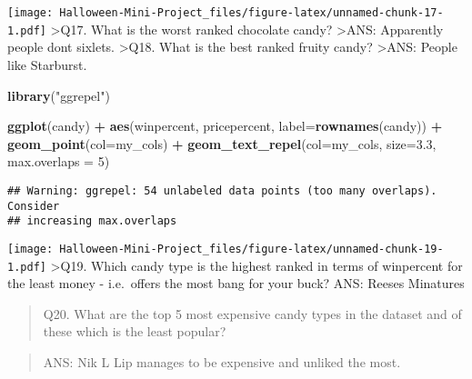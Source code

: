 \documentclass[
]{article}
\newenvironment{Shaded}{\begin{snugshade}}{\end{snugshade}}
\newcommand{\AttributeTok}[1]{\textcolor[rgb]{0.13,0.29,0.53}{#1}}
\newcommand{\ConstantTok}[1]{\textcolor[rgb]{0.56,0.35,0.01}{#1}}
\newcommand{\DecValTok}[1]{\textcolor[rgb]{0.00,0.00,0.81}{#1}}
\newcommand{\FloatTok}[1]{\textcolor[rgb]{0.00,0.00,0.81}{#1}}
\newcommand{\FunctionTok}[1]{\textcolor[rgb]{0.13,0.29,0.53}{\textbf{#1}}}
\newcommand{\NormalTok}[1]{#1}
\newcommand{\OtherTok}[1]{\textcolor[rgb]{0.56,0.35,0.01}{#1}}
\newcommand{\SpecialCharTok}[1]{\textcolor[rgb]{0.81,0.36,0.00}{\textbf{#1}}}
\newcommand{\StringTok}[1]{\textcolor[rgb]{0.31,0.60,0.02}{#1}}
\begin{document}
\texttt{[image: Halloween-Mini-Project\_files/figure-latex/unnamed-chunk-17-1.pdf]}
\textgreater Q17. What is the worst ranked chocolate candy?
\textgreater ANS: Apparently people dont sixlets. \textgreater Q18. What
is the best ranked fruity candy? \textgreater ANS: People like
Starburst.

\begin{Shaded}
\begin{Highlighting}[]
\FunctionTok{library}\NormalTok{(}\StringTok{"ggrepel"}\NormalTok{)}
\end{Highlighting}
\end{Shaded}

\begin{Shaded}
\begin{Highlighting}[]
\FunctionTok{ggplot}\NormalTok{(candy) }\SpecialCharTok{+}
  \FunctionTok{aes}\NormalTok{(winpercent, pricepercent, }\AttributeTok{label=}\FunctionTok{rownames}\NormalTok{(candy)) }\SpecialCharTok{+}
  \FunctionTok{geom\_point}\NormalTok{(}\AttributeTok{col=}\NormalTok{my\_cols) }\SpecialCharTok{+} 
  \FunctionTok{geom\_text\_repel}\NormalTok{(}\AttributeTok{col=}\NormalTok{my\_cols, }\AttributeTok{size=}\FloatTok{3.3}\NormalTok{, }\AttributeTok{max.overlaps =} \DecValTok{5}\NormalTok{)}
\end{Highlighting}
\end{Shaded}

\begin{verbatim}
## Warning: ggrepel: 54 unlabeled data points (too many overlaps). Consider
## increasing max.overlaps
\end{verbatim}

\texttt{[image: Halloween-Mini-Project\_files/figure-latex/unnamed-chunk-19-1.pdf]}
\textgreater Q19. Which candy type is the highest ranked in terms of
winpercent for the least money - i.e.~offers the most bang for your
buck? ANS: Reeses Minatures

\begin{quote}
Q20. What are the top 5 most expensive candy types in the dataset and of
these which is the least popular?
\end{quote}

\begin{quote}
ANS: Nik L Lip manages to be expensive and unliked the most.
\end{quote}

\begin{Shaded}
\end{Shaded}
\end{document}
